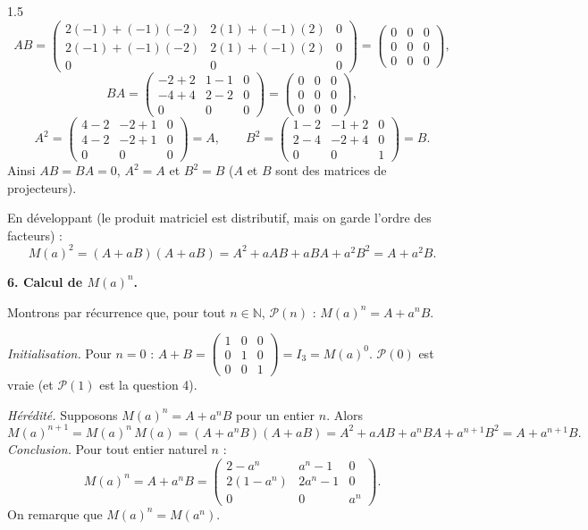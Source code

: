 \documentclass[12pt]{article}
\begin{document}
\begin{spacing}{1.5}
\[
AB=\begin{pmatrix}
2(-1)+(-1)(-2) & 2(1)+(-1)(2) & 0\\
2(-1)+(-1)(-2) & 2(1)+(-1)(2) & 0\\
0&0&0
\end{pmatrix}=\begin{pmatrix}0&0&0\\0&0&0\\0&0&0\end{pmatrix},
\]
\[
BA=\begin{pmatrix}
-2+2 & 1-1 & 0\\
-4+4 & 2-2 & 0\\
0&0&0
\end{pmatrix}=\begin{pmatrix}0&0&0\\0&0&0\\0&0&0\end{pmatrix},
\]
\[
A^2=\begin{pmatrix}
4-2 & -2+1 & 0\\
4-2 & -2+1 & 0\\
0&0&0
\end{pmatrix}=A,
\qquad
B^2=\begin{pmatrix}
1-2 & -1+2 & 0\\
2-4 & -2+4 & 0\\
0&0&1
\end{pmatrix}=B .
\]
Ainsi $AB=BA=0$, $A^2=A$ et $B^2=B$ ($A$ et $B$ sont des matrices de projecteurs).

En développant (le produit matriciel est distributif, mais on garde l'ordre des facteurs) :
\[
M(a)^2=(A+aB)(A+aB)=A^2+aAB+aBA+a^2B^2=A+a^2B .
\]

\textbf{6. Calcul de $M(a)^n$.}

Montrons par récurrence que, pour tout $n\in\mathbb{N}$, $\mathcal{P}(n)$ : $M(a)^n=A+a^nB$.

\emph{Initialisation.} Pour $n=0$ : $A+B=\begin{pmatrix}1&0&0\\0&1&0\\0&0&1\end{pmatrix}=I_3=M(a)^0$. $\mathcal{P}(0)$ est vraie (et $\mathcal{P}(1)$ est la question 4).

\emph{Hérédité.} Supposons $M(a)^n=A+a^nB$ pour un entier $n$. Alors
\[
M(a)^{n+1}=M(a)^n\,M(a)=(A+a^nB)(A+aB)=A^2+aAB+a^nBA+a^{n+1}B^2=A+a^{n+1}B .
\]
\emph{Conclusion.} Pour tout entier naturel $n$ :
\[
M(a)^n=A+a^nB=\begin{pmatrix}
2-a^n & a^n-1 & 0 \\
2(1-a^n) & 2a^n-1 & 0\\
0 & 0 & a^n
\end{pmatrix}.
\]
On remarque que $M(a)^n=M(a^n)$.


\end{spacing}
\end{document}
